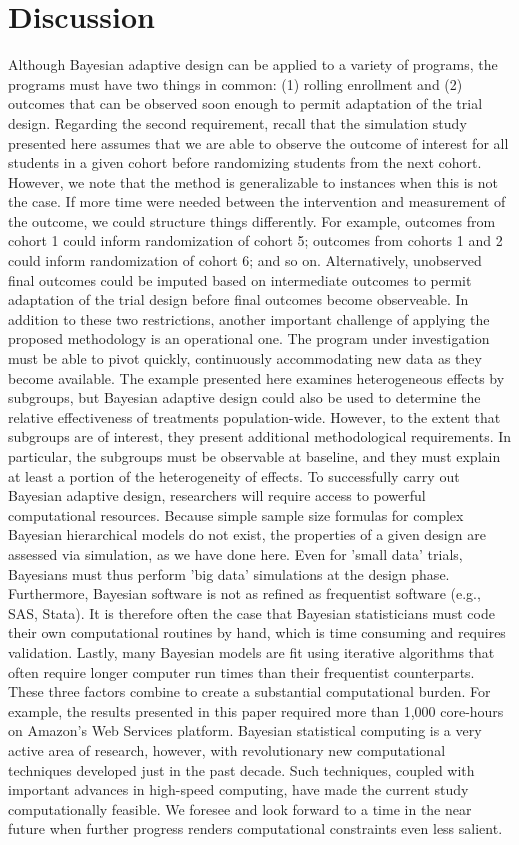 \documentclass{acm_proc_article-sp}
\begin{document}
\section{Discussion}
Although Bayesian adaptive design can be applied to a variety of programs, the programs must have two things in common: (1) rolling enrollment and (2) outcomes that can be observed soon enough to permit adaptation of the trial design. Regarding the second requirement, recall that the simulation study presented here assumes that we are able to observe the outcome of interest for all students in a given cohort before randomizing students from the next cohort. However, we note that the method is generalizable to instances when this is not the case. If more time were needed between the intervention and measurement of the outcome, we could structure things differently. For example, outcomes from cohort 1 could inform randomization of cohort 5; outcomes from cohorts 1 and 2 could inform randomization of cohort 6; and so on. Alternatively, unobserved final outcomes could be imputed based on intermediate outcomes to permit adaptation of the trial design before final outcomes become observeable.
In addition to these two restrictions, another important challenge of applying the proposed methodology is an operational one. The program under investigation must be able to pivot quickly, continuously accommodating new data as they become available. 
The example presented here examines heterogeneous effects by subgroups, but Bayesian adaptive design could also be used to determine the relative effectiveness of treatments population-wide. However, to the extent that subgroups are of interest, they present additional methodological requirements. In particular, the subgroups must be observable at baseline, and they must explain at least a portion of the heterogeneity of effects.
To successfully carry out Bayesian adaptive design, researchers will require access to powerful computational resources. Because simple sample size formulas for complex Bayesian hierarchical models do not exist, the properties of a given design are assessed via simulation, as we have done here. Even for 'small data' trials, Bayesians must thus perform 'big data' simulations at the design phase. Furthermore, Bayesian software is not as refined as frequentist software (e.g., SAS, Stata). It is therefore often the case that Bayesian statisticians must code their own computational routines by hand, which is time consuming and requires validation. Lastly, many Bayesian models are fit using iterative algorithms that often require longer computer run times than their frequentist counterparts. These three factors combine to create a substantial computational burden. For example, the results presented in this paper required more than 1,000 core-hours on Amazon’s Web Services platform. 
Bayesian statistical computing is a very active area of research, however, with revolutionary new computational techniques developed just in the past decade. Such techniques, coupled with important advances in high-speed computing, have made the current study computationally feasible. We foresee and look forward to a time in the near future when further progress renders computational constraints even less salient.
\end{document}
